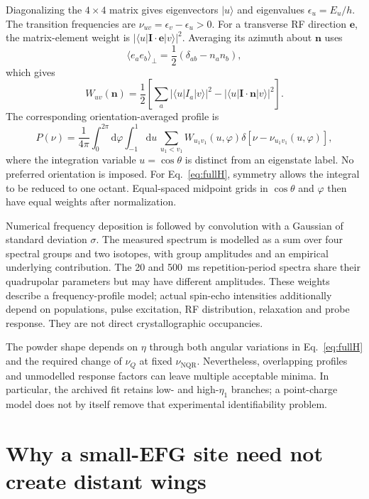 \documentclass[11pt,a4paper]{article}
\newcommand{\dd}{\mathrm d}
\newcommand{\nvec}{\bm n}
\newcommand{\nuq}{\nu_Q}
\newcommand{\nunqr}{\nu_{\mathrm{NQR}}}
\begin{document}
Diagonalizing the $4\times4$ matrix gives eigenvectors $|u\rangle$ and
eigenvalues $\epsilon_u=E_u/h$. The transition frequencies are
$\nu_{uv}=\epsilon_v-\epsilon_u>0$. For a transverse RF direction $\bm e$,
the matrix-element weight is $|\langle u|\bm I\cdot\bm e|v\rangle|^2$.
Averaging its azimuth about $\nvec$ uses
\begin{equation}
 \langle e_a e_b\rangle_\perp
 =\frac12(\delta_{ab}-n_a n_b),
\end{equation}
which gives
\begin{equation}
 W_{uv}(\nvec)=\frac12\left[
 \sum_a|\langle u|I_a|v\rangle|^2
 -|\langle u|\bm I\cdot\nvec|v\rangle|^2\right].
\end{equation}
The corresponding orientation-averaged profile is
\begin{equation}
 P(\nu)=\frac1{4\pi}\int_0^{2\pi}\!\dd\varphi
 \int_{-1}^{1}\!\dd u\,
 \sum_{u_1<v_1}W_{u_1v_1}(u,\varphi)
 \delta[\nu-\nu_{u_1v_1}(u,\varphi)],
\label{eq:powder}
\end{equation}
where the integration variable $u=\cos\theta$ is distinct from an eigenstate
label. No preferred orientation is imposed. For Eq.~\eqref{eq:fullH}, symmetry
allows the integral to be reduced to one octant. Equal-spaced midpoint grids in
$\cos\theta$ and $\varphi$ then have equal weights after normalization.

Numerical frequency deposition is followed by convolution with a Gaussian of
standard deviation $\sigma$. The measured spectrum is modelled as a sum over
four spectral groups and two isotopes, with group amplitudes and an empirical
underlying contribution. The 20 and 500~ms repetition-period spectra share
their quadrupolar parameters but may have different amplitudes. These weights
describe a frequency-profile model; actual spin-echo intensities additionally
depend on populations, pulse excitation, RF distribution, relaxation and probe
response. They are not direct crystallographic occupancies.

The powder shape depends on $\eta$ through both angular variations in
Eq.~\eqref{eq:fullH} and the required change of $\nuq$ at fixed $\nunqr$.
Nevertheless, overlapping profiles and unmodelled response factors can leave
multiple acceptable minima. In particular, the archived fit retains low- and
high-$\eta_1$ branches; a point-charge model does not by itself remove that
experimental identifiability problem.

\section{Why a small-EFG site need not create distant wings}
\end{document}
